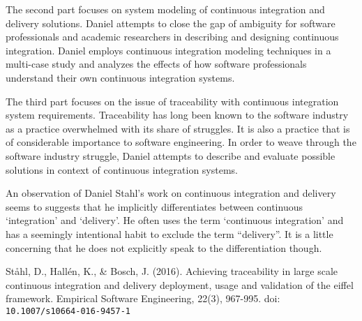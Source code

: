 \documentclass[11pt,a4paper]{article}
\begin{document}
\begin{thebibliography}{6}
\begin{adjustwidth}{1cm}{}
		The second part focuses on system modeling of continuous integration and delivery
		solutions. Daniel attempts to close the gap of ambiguity for software professionals and
		academic researchers in describing and designing continuous integration. Daniel
		employs continuous integration modeling techniques in a multi-case study and analyzes
		the effects of how software professionals understand their own continuous integration
		systems.
		
		The third part focuses on the issue of traceability with continuous integration system
		requirements. Traceability has long been known to the software industry as a practice
		overwhelmed with its share of struggles. It is also a practice that is of considerable
		importance to software engineering. In order to weave through the software industry
		struggle, Daniel attempts to describe and evaluate possible solutions in context of
		continuous integration systems.
		
		An observation of Daniel Stahl’s work on continuous integration and delivery seems to
		suggests that he implicitly differentiates between continuous ‘integration’ and
		‘delivery’. He often uses the term ‘continuous integration’ and has a seemingly
		intentional habit to exclude the term “delivery”. It is a little concerning that he does not
		explicitly speak to the differentiation though.
	\end{adjustwidth}
	
	St\aa hl, D., Hall\'{e}n, K., \& Bosch, J. (2016). Achieving traceability in large scale continuous integration and delivery deployment, usage and validation of the eiffel framework. Empirical Software Engineering, 22(3), 967-995. doi:\\\texttt{10.1007/s10664-016-9457-1}
	
	
\end{thebibliography}
\end{document}
